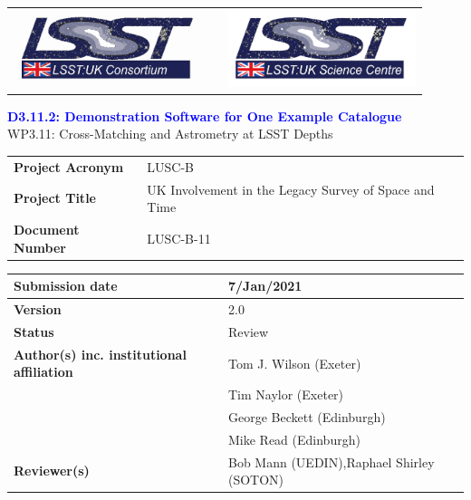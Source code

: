 \documentclass[a4paper,11pt]{scrartcl}
\def\title{D3.11.2: Demonstration Software for One Example Catalogue}
\begin{document}
\begin{center}
\begin{tabular}{p{6cm}p{4cm}p{6cm}}
\includegraphics[width=5.5cm]{lsst-uk_consortium_small.png} & & \includegraphics[width=5.5cm]{lsst-uk_science_centre_small.png} \\
\end{tabular}
\end{center}

\thispagestyle{fancy}
\begin{center}
{\Huge\textcolor{Blue}{\textbf{\title}}}\\[2ex]

{\LARGE\textcolor{BrickRed}{WP3.11: Cross-Matching and Astrometry at LSST Depths}}\\

\end{center}

\begin{table}[ht]
\centering
\renewcommand{\arraystretch}{1.75}
\begin{tabular}{>{\bfseries}p{4.5cm}p{11.5cm}}
Project Acronym & LUSC-B\\
Project Title   & UK Involvement in the Legacy Survey of Space and Time\\
Document Number & LUSC-B-11
\end{tabular}
\end{table}

\begin{table}[ht]
\centering
\renewcommand{\arraystretch}{1.75}
\begin{tabular}{|>{\bfseries}p{4.5cm}|p{11.5cm}|}
\hline
Submission date & 7/Jan/2021 \\\hline
Version & 2.0 \\\hline
Status  & Review \\\hline
\parbox{4cm}{Author(s) inc. institutional affiliation} & Tom J. Wilson (Exeter) \\ & Tim Naylor (Exeter) \\ & George Beckett (Edinburgh) \\ & Mike Read (Edinburgh) \\\hline
Reviewer(s) & \parbox{11cm}{\raggedright Bob Mann (UEDIN),\linebreak Raphael Shirley (SOTON)}\\\hline
\end{tabular}\\[2ex]
\end{table}
\end{document}
